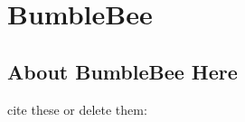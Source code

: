 \chapter{BumbleBee}
\label{bumblebee}
%

\section{About BumbleBee Here}
%


cite these or delete them:
\cite{dutta2005system}
\cite{xu2003impact}